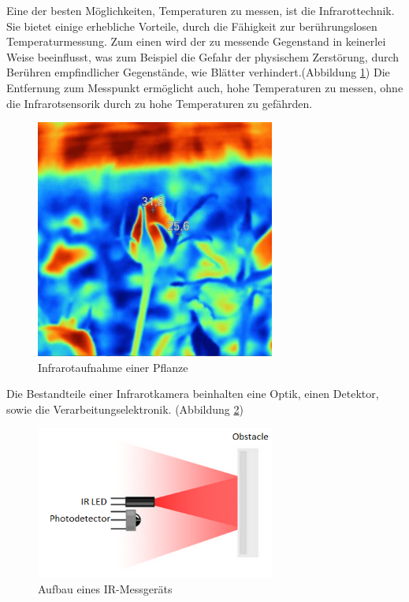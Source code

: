 Eine der besten Möglichkeiten, Temperaturen zu messen, ist die Infrarottechnik.
Sie bietet einige erhebliche Vorteile, durch die Fähigkeit zur berührungslosen
Temperaturmessung. Zum einen wird der zu messende Gegenstand in keinerlei Weise
beeinflusst, was zum Beispiel die Gefahr der physischem Zerstörung, durch
Berühren empfindlicher Gegenstände, wie Blätter verhindert.(Abbildung
\ref{fig:infrarot_pflanze}) Die Entfernung zum Messpunkt ermöglicht auch, 
hohe Temperaturen zu messen, ohne die Infrarotsensorik durch zu hohe
Temperaturen zu gefährden. \begin{figure}[!h]
	\centering
	\includegraphics[width=0.7\textwidth]{bilder/Measuring-crop-temperatures .jpeg}
	\caption[Infrarotaufnahme einer Pflanze]{Infrarotaufnahme einer Pflanze \cite{IRPflanze}}
	\label{fig:infrarot_pflanze}
\end{figure}

Die Bestandteile einer Infrarotkamera beinhalten eine Optik, einen Detektor,
sowie die Verarbeitungselektronik. (Abbildung \ref{fig:aufbau infrarotsensor})
\begin{figure}[ht]
	\centering
	\includegraphics[width=0.7\textwidth]{bilder/infrarotsensor.png}
	\caption[Aufbau eines IR-Messgeräts]{Aufbau eines IR-Messgeräts \cite{IR}}
	\label{fig:aufbau infrarotsensor}
\end{figure}

